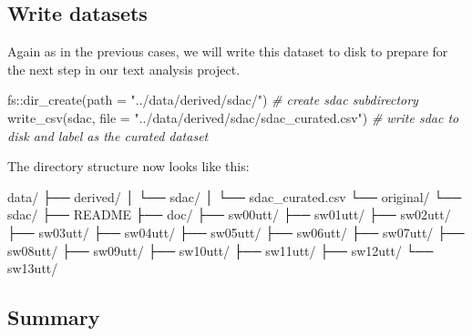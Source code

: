 \documentclass[
  letterpaper,
]{latex/krantz}
\newenvironment{Shaded}{\begin{snugshade}}{\end{snugshade}}
\newcommand{\AttributeTok}[1]{\textcolor[rgb]{0.00,0.00,0.00}{#1}}
\newcommand{\CommentTok}[1]{\textcolor[rgb]{0.00,0.00,0.00}{\textit{#1}}}
\newcommand{\ExtensionTok}[1]{\textcolor[rgb]{0.00,0.00,0.00}{#1}}
\newcommand{\FunctionTok}[1]{\textcolor[rgb]{0.00,0.00,0.00}{#1}}
\newcommand{\NormalTok}[1]{\textcolor[rgb]{0.00,0.00,0.00}{#1}}
\newcommand{\SpecialCharTok}[1]{\textcolor[rgb]{0.00,0.00,0.00}{#1}}
\newcommand{\StringTok}[1]{\textcolor[rgb]{0.00,0.00,0.00}{#1}}
\begin{document}
\hypertarget{write-datasets}{%
\subsection{Write datasets}\label{write-datasets}}

Again as in the previous cases, we will write this dataset to disk to
prepare for the next step in our text analysis project.

\begin{Shaded}
\begin{Highlighting}[]
\NormalTok{fs}\SpecialCharTok{::}\FunctionTok{dir\_create}\NormalTok{(}\AttributeTok{path =} \StringTok{"../data/derived/sdac/"}\NormalTok{) }\CommentTok{\# create sdac subdirectory}
\FunctionTok{write\_csv}\NormalTok{(sdac, }
          \AttributeTok{file =} \StringTok{"../data/derived/sdac/sdac\_curated.csv"}\NormalTok{) }\CommentTok{\# write sdac to disk and label as the curated dataset}
\end{Highlighting}
\end{Shaded}

The directory structure now looks like this:

\begin{Shaded}
\begin{Highlighting}[]
\ExtensionTok{data/}
\ExtensionTok{├──}\NormalTok{ derived/}
\ExtensionTok{│}\NormalTok{   └── sdac/}
\ExtensionTok{│}\NormalTok{       └── sdac\_curated.csv}
\ExtensionTok{└──}\NormalTok{ original/}
    \ExtensionTok{└──}\NormalTok{ sdac/}
        \ExtensionTok{├──}\NormalTok{ README}
        \ExtensionTok{├──}\NormalTok{ doc/}
        \ExtensionTok{├──}\NormalTok{ sw00utt/}
        \ExtensionTok{├──}\NormalTok{ sw01utt/}
        \ExtensionTok{├──}\NormalTok{ sw02utt/}
        \ExtensionTok{├──}\NormalTok{ sw03utt/}
        \ExtensionTok{├──}\NormalTok{ sw04utt/}
        \ExtensionTok{├──}\NormalTok{ sw05utt/}
        \ExtensionTok{├──}\NormalTok{ sw06utt/}
        \ExtensionTok{├──}\NormalTok{ sw07utt/}
        \ExtensionTok{├──}\NormalTok{ sw08utt/}
        \ExtensionTok{├──}\NormalTok{ sw09utt/}
        \ExtensionTok{├──}\NormalTok{ sw10utt/}
        \ExtensionTok{├──}\NormalTok{ sw11utt/}
        \ExtensionTok{├──}\NormalTok{ sw12utt/}
        \ExtensionTok{└──}\NormalTok{ sw13utt/}
\end{Highlighting}
\end{Shaded}

\hypertarget{summary-8}{%
\subsection{Summary}\label{summary-8}}
\end{document}

